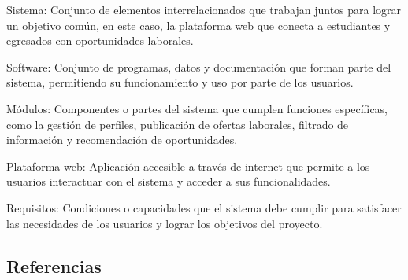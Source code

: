 \documentclass[11pt,a4paper]{Plantilla}
\begin{document}
\vspace{5pt}

Sistema: Conjunto de elementos interrelacionados que trabajan juntos para lograr un objetivo común, en este caso, la plataforma web que conecta a estudiantes y egresados con oportunidades laborales.

\vspace{5pt}

Software: Conjunto de programas, datos y documentación que forman parte del sistema, permitiendo su funcionamiento y uso por parte de los usuarios.

\vspace{5pt}

Módulos: Componentes o partes del sistema que cumplen funciones específicas, como la gestión de perfiles, publicación de ofertas laborales, filtrado de información y recomendación de oportunidades.

\vspace{5pt}

Plataforma web: Aplicación accesible a través de internet que permite a los usuarios interactuar con el sistema y acceder a sus funcionalidades.

\vspace{5pt}

Requisitos: Condiciones o capacidades que el sistema debe cumplir para satisfacer las necesidades de los usuarios y lograr los objetivos del proyecto.


\subsection{Referencias}%
\end{document}
